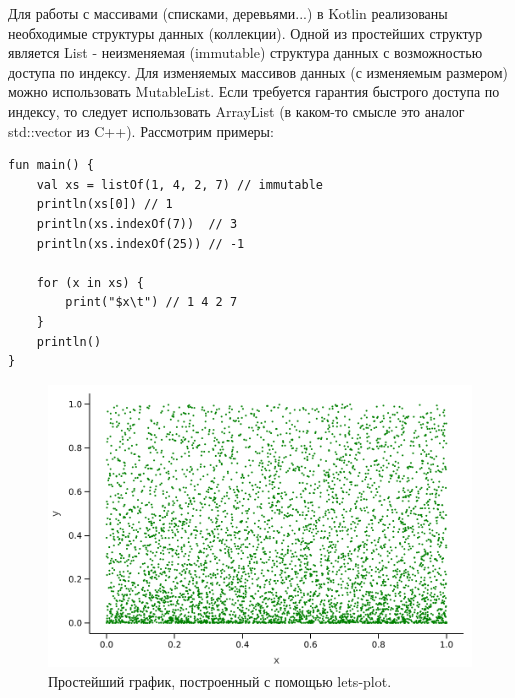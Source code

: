 \documentclass{book}
\begin{document}
Для работы с массивами (списками, деревьями...) в Kotlin реализованы необходимые структуры данных
(коллекции). Одной из простейших структур является List - неизменяемая (immutable) структура данных
с возможностью доступа по индексу. Для изменяемых массивов данных (с изменяемым размером) можно
использовать MutableList. Если требуется гарантия быстрого доступа по индексу, то следует
использовать ArrayList (в каком-то смысле это аналог std::vector из C++). Рассмотрим примеры:
\begin{verbatim}
fun main() {
    val xs = listOf(1, 4, 2, 7) // immutable
    println(xs[0]) // 1
    println(xs.indexOf(7))  // 3
    println(xs.indexOf(25)) // -1

    for (x in xs) {
        print("$x\t") // 1 4 2 7
    }
    println()
}
\end{verbatim}

\begin{figure}
	\includegraphics[width=1\linewidth]{LetsPlotExample.png}
    \caption{\label{LetsPlotExample}Простейший график, построенный с помощью lets-plot.}
\end{figure}
\end{document}
